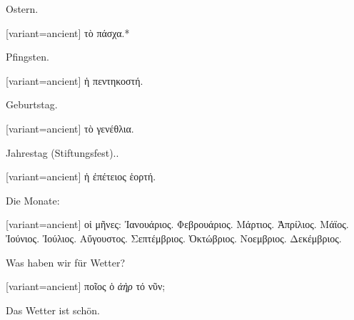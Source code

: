 Ostern.

\switchcolumn

\begin{greek}[variant=ancient]%
τὸ πάσχα.{*}

\end{greek}%
\switchcolumn*

Pfingsten.

\switchcolumn

\begin{greek}[variant=ancient]%
ἡ πεντηκοστή.

\end{greek}%
\switchcolumn*

Geburts\textcompwordmark{}tag.

\switchcolumn

\begin{greek}[variant=ancient]%
τὸ γενέθλια.

\end{greek}%
\switchcolumn*

Jahres\textcompwordmark{}tag (Stiftungs\textcompwordmark{}fest)..

\switchcolumn

\begin{greek}[variant=ancient]%
ἡ ἐπέτειος ἑορτή.

\end{greek}%
\switchcolumn*[\centering\rule{1.5in}{1pt}]

Die Monate:

\switchcolumn

\begin{greek}[variant=ancient]%
οἱ μῆνες: Ἰανουάριος. Φεβρουάριος. Μάρτιος. Ἀπρίλιος. Μάϊος. Ἰούνιος.
Ἰούλιος. Αὔγουστος. Σεπτέμβριος. Ὀκτώβριος. Νοεμβριος. Δεκέμβριος.

\end{greek}%
\indent Was haben wir für Wetter?

\switchcolumn

\begin{greek}[variant=ancient]%
ποῖος ὁ \emph{ἀὴρ} τό νῦν;

\end{greek}%
\switchcolumn*

Das Wetter ist schön.


